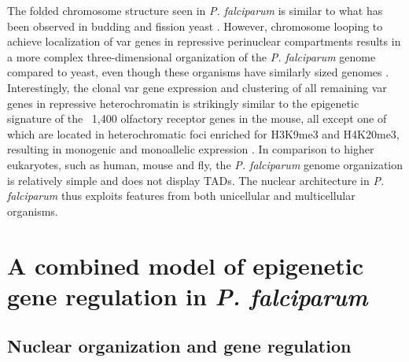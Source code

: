 The folded chromosome structure seen in \textit{P. falciparum} is similar to what has
been observed in budding and fission yeast \citep{duan:three,
tanizawa:mapping}. However, chromosome
looping to achieve localization of var genes in repressive perinuclear
compartments results in a more complex three-dimensional organization of the
\textit{P. falciparum} genome compared to yeast, even though these organisms have
similarly sized genomes \citep{ay:three-dimensional}.
Interestingly, the clonal var gene expression
and clustering of all remaining var genes in repressive heterochromatin is
strikingly similar to the epigenetic signature of the ~1,400 olfactory
receptor genes in the mouse, all except one of which are located in
heterochromatic foci enriched for H3K9me3 and H4K20me3, resulting in monogenic
and monoallelic expression \citep{magklara:epigenetic, lyons:epigenetic}.
In comparison to higher eukaryotes, such
as human, mouse and fly, the \textit{P. falciparum} genome organization is relatively
simple and does not display TADs. The nuclear architecture in \textit{P.
falciparum}
thus exploits features from both unicellular and multicellular organisms.

\section{A combined model of epigenetic gene regulation in \textit{P.
falciparum}}

\subsection{Nuclear organization and gene regulation}

